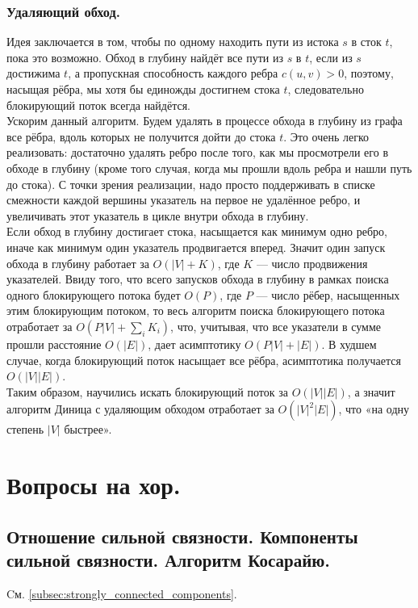 \documentclass[a4paper,14pt]{article}
\begin{document}
    \subsubsection*{Удаляющий обход.}
    Идея заключается в том, чтобы по одному находить пути из истока
$s$ в сток $t$, пока это возможно. Обход в глубину найдёт все пути из
$s$ в $t$, если из $s$ достижима $t$, а пропускная способность каждого
ребра $c(u,v) > 0$, поэтому, насыщая рёбра, мы хотя бы единожды
достигнем стока $t$, следовательно блокирующий поток всегда найдётся. \\
Ускорим данный алгоритм. Будем удалять в процессе обхода в
глубину из графа все рёбра, вдоль которых не получится дойти до
стока $t$. Это очень легко реализовать: достаточно удалять ребро
после того, как мы просмотрели его в обходе в глубину (кроме того
случая, когда мы прошли вдоль ребра и нашли путь до стока). С
точки зрения реализации, надо просто поддерживать в списке
смежности каждой вершины указатель на первое не удалённое
ребро, и увеличивать этот указатель в цикле внутри обхода в
глубину. \\
Если обход в глубину достигает стока, насыщается как минимум
одно ребро, иначе как минимум один указатель продвигается
вперед. Значит один запуск обхода в глубину работает за
$O(|V|+K)$, где $K$ — число продвижения указателей. Ввиду того,
что всего запусков обхода в глубину в рамках поиска одного
блокирующего потока будет $O(P)$, где $P$ — число рёбер,
насыщенных этим блокирующим потоком, то весь алгоритм поиска
блокирующего потока отработает за $O(P|V|+\sum\limits_i K_i)$, что, учитывая,
что все указатели в сумме прошли расстояние $O(|E|)$, дает
асимптотику $O(P|V|+|E|)$. В худшем случае, когда блокирующий
поток насыщает все рёбра, асимптотика получается $O(|V||E|)$. \\
Таким образом, научились искать блокирующий поток за $O(|V||E|)$,
а значит алгоритм Диница с удаляющим обходом отработает за
$O(|V|^2|E|)$, что «на одну степень $|V|$ быстрее».


    \section{Вопросы на хор.}

    \subsection{Отношение сильной связности. Компоненты сильной связности. Алгоритм Косарайю.}
    Cм. \ref{subsec:strongly_connected_components}.
\end{document}

